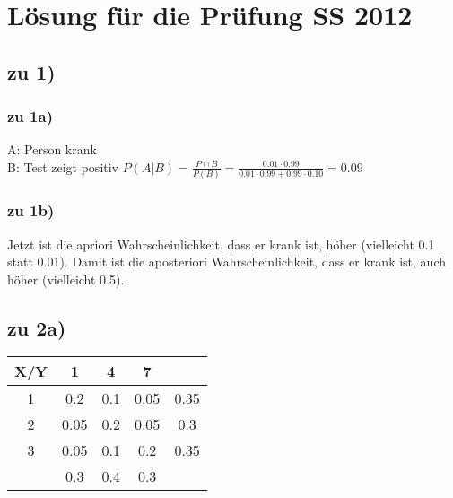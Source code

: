 \renewcommand{\ldate}{2016-01-11}


\section{Lösung für die Prüfung SS 2012}

\subsection{zu 1)}

\subsubsection{zu 1a)}
A: Person krank\\
B: Test zeigt positiv
$P(A|B) = \frac{P\cap B}{P(B)} = \frac{0.01\cdot 0.99}{0.01\cdot 0.99 + 0.99\cdot 0.10} = 0.09$

\subsubsection{zu 1b)}
Jetzt ist die apriori Wahrscheinlichkeit, dass er krank ist, höher (vielleicht 0.1 statt 0.01). Damit ist die aposteriori Wahrscheinlichkeit, dass er krank ist, auch höher (vielleicht 0.5). 

\subsection{zu 2a)}

\begin{tabular}{|c|c|c|c|c|}
\hline X/Y & 1 & 4 & 7 &  \\ 
\hline 1 & 0.2 & 0.1 & 0.05 & 0.35 \\ 
\hline 2 & 0.05 & 0.2 & 0.05 & 0.3 \\ 
\hline 3 & 0.05 & 0.1 & 0.2 & 0.35 \\ 
\hline  & 0.3 & 0.4 & 0.3 &  \\ 
\hline 
\end{tabular} 

